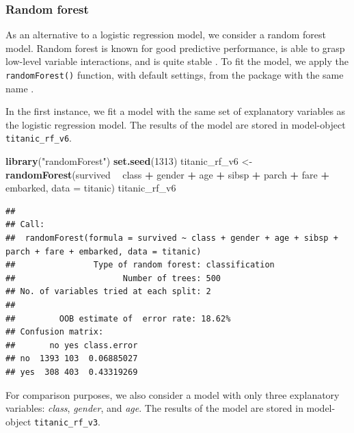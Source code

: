 \documentclass[12pt,]{krantz}
\newenvironment{Shaded}{\begin{snugshade}}{\end{snugshade}}
\newcommand{\DataTypeTok}[1]{\textcolor[rgb]{0.13,0.29,0.53}{#1}}
\newcommand{\DecValTok}[1]{\textcolor[rgb]{0.00,0.00,0.81}{#1}}
\newcommand{\KeywordTok}[1]{\textcolor[rgb]{0.13,0.29,0.53}{\textbf{#1}}}
\newcommand{\NormalTok}[1]{#1}
\newcommand{\OperatorTok}[1]{\textcolor[rgb]{0.81,0.36,0.00}{\textbf{#1}}}
\newcommand{\StringTok}[1]{\textcolor[rgb]{0.31,0.60,0.02}{#1}}
\begin{document}
\hypertarget{model-titanic-rf}{%
\subsubsection{Random forest}\label{model-titanic-rf}}

As an alternative to a logistic regression model, we consider a random forest model. Random forest is known for good predictive performance, is able to grasp low-level variable interactions, and is quite stable \citep{randomForestBreiman}. To fit the model, we apply the \texttt{randomForest()} function, with default settings, from the package with the same name \citep{randomForestRNews}.

In the first instance, we fit a model with the same set of explanatory variables as the logistic regression model. The results of the model are stored in model-object \texttt{titanic\_rf\_v6}.

\begin{Shaded}
\begin{Highlighting}[]
\KeywordTok{library}\NormalTok{(}\StringTok{"randomForest"}\NormalTok{)}
\KeywordTok{set.seed}\NormalTok{(}\DecValTok{1313}\NormalTok{)}
\NormalTok{titanic_rf_v6 <-}\StringTok{ }\KeywordTok{randomForest}\NormalTok{(survived }\OperatorTok{~}\StringTok{ }\NormalTok{class }\OperatorTok{+}\StringTok{ }\NormalTok{gender }\OperatorTok{+}\StringTok{ }\NormalTok{age }\OperatorTok{+}\StringTok{ }\NormalTok{sibsp }\OperatorTok{+}\StringTok{ }\NormalTok{parch }\OperatorTok{+}\StringTok{ }\NormalTok{fare }\OperatorTok{+}\StringTok{ }\NormalTok{embarked, }
                           \DataTypeTok{data =}\NormalTok{ titanic)}
\NormalTok{titanic_rf_v6}
\end{Highlighting}
\end{Shaded}

\begin{verbatim}
## 
## Call:
##  randomForest(formula = survived ~ class + gender + age + sibsp +      parch + fare + embarked, data = titanic) 
##                Type of random forest: classification
##                      Number of trees: 500
## No. of variables tried at each split: 2
## 
##         OOB estimate of  error rate: 18.62%
## Confusion matrix:
##       no yes class.error
## no  1393 103  0.06885027
## yes  308 403  0.43319269
\end{verbatim}

For comparison purposes, we also consider a model with only three explanatory variables: \emph{class}, \emph{gender}, and \emph{age}. The results of the model are stored in model-object \texttt{titanic\_rf\_v3}.
\end{document}
